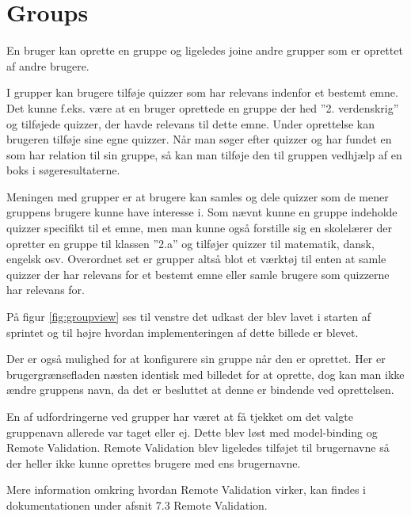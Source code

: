 \section{Groups}
En bruger kan oprette en gruppe og ligeledes joine andre grupper som er oprettet af andre brugere.

I grupper kan brugere tilføje quizzer som har relevans indenfor et bestemt emne. Det kunne f.eks. være at en bruger oprettede en gruppe der hed ''2. verdenskrig'' og tilføjede quizzer, der havde relevans til dette emne. Under oprettelse kan brugeren tilføje sine egne quizzer. Når man søger efter quizzer og har fundet en som har relation til sin gruppe, så kan man tilføje den til gruppen vedhjælp af en boks i søgeresultaterne.

Meningen med grupper er at brugere kan samles og dele quizzer som de mener gruppens brugere kunne have interesse i.  Som nævnt kunne en gruppe indeholde quizzer specifikt til et emne, men man kunne også forstille sig en skolelærer der opretter en gruppe til klassen ''2.a'' og tilføjer quizzer til matematik, dansk, engelsk osv. Overordnet set er grupper altså blot et værktøj til enten at samle quizzer der har relevans for et bestemt emne eller samle brugere som quizzerne har relevans for.


På figur \ref{fig:groupview} ses til venstre det udkast der blev lavet i starten af sprintet og til højre hvordan implementeringen af dette billede er blevet.

Der er også mulighed for at konfigurere sin gruppe når den er oprettet. Her er brugergrænsefladen næsten identisk med billedet for at oprette, dog kan man ikke ændre gruppens navn, da det er besluttet at denne er bindende ved oprettelsen.

En af udfordringerne ved grupper har været at få tjekket om det valgte gruppenavn allerede var taget eller ej. Dette blev løst med model-binding og Remote Validation. Remote Validation blev ligeledes tilføjet til brugernavne så der heller ikke kunne oprettes brugere med ens brugernavne.

Mere information omkring hvordan Remote Validation virker, kan findes i dokumentationen under afsnit 7.3 Remote Validation.
